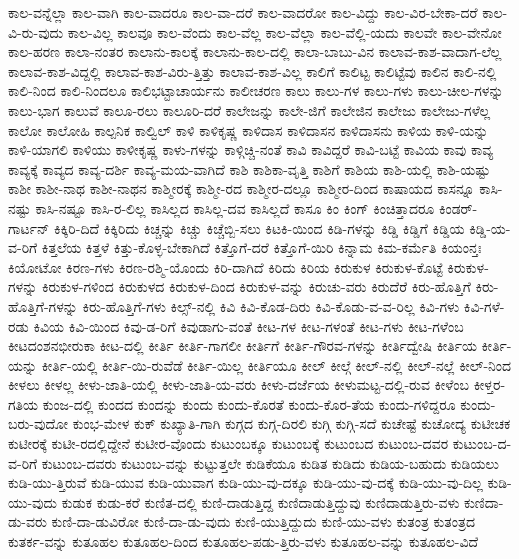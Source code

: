 {ಕಾಲ-ವನ್ನೆಲ್ಲಾ
ಕಾಲ-ವಾಗಿ
ಕಾಲ-ವಾದರೂ
ಕಾಲ-ವಾ-ದರೆ
ಕಾಲ-ವಾದರೋ
ಕಾಲ-ವಿದ್ದು
ಕಾಲ-ವಿರ-ಬೇಕಾ-ದರೆ
ಕಾಲ-ವಿ-ರು-ವುದು
ಕಾಲ-ವಿಲ್ಲ
ಕಾಲವೂ
ಕಾಲ-ವೆಂದು
ಕಾಲ-ವೆಲ್ಲ
ಕಾಲ-ವೆಲ್ಲಾ
ಕಾಲ-ವೆಲ್ಲಿ-ಯದು
ಕಾಲವೇ
ಕಾಲ-ವೇನೋ
ಕಾಲ-ಹರಣ
ಕಾಲಾ-ನಂತರ
ಕಾಲಾನು-ಕಾಲಕ್ಕೆ
ಕಾಲಾನು-ಕಾಲ-ದಲ್ಲಿ
ಕಾಲಾ-ಬಾಬು-ವಿನ
ಕಾಲಾವ-ಕಾಶ-ವಾದಾಗ-ಲೆಲ್ಲ
ಕಾಲಾವ-ಕಾಶ-ವಿದ್ದಲ್ಲಿ
ಕಾಲಾವ-ಕಾಶ-ವಿರು-ತ್ತಿತ್ತು
ಕಾಲಾವ-ಕಾಶ-ವಿಲ್ಲ
ಕಾಲಿಗೆ
ಕಾಲಿಟ್ಟ
ಕಾಲಿಟ್ಟೆವು
ಕಾಲಿನ
ಕಾಲಿ-ನಲ್ಲಿ
ಕಾಲಿ-ನಿಂದ
ಕಾಲಿ-ನಿಂದಲೂ
ಕಾಲಿಭಟ್ಟಾಚಾರ್ಯನು
ಕಾಲೀಚರಣ
ಕಾಲು
ಕಾಲು-ಗಳ
ಕಾಲು-ಗಳು
ಕಾಲು-ಚೀಲ-ಗಳನ್ನು
ಕಾಲು-ಭಾಗ
ಕಾಲುವೆ
ಕಾಲೂ-ರಲು
ಕಾಲೂರಿ-ದರೆ
ಕಾಲೇಜನ್ನು
ಕಾಲೇ-ಜಿಗೆ
ಕಾಲೇಜಿನ
ಕಾಲೇಜು
ಕಾಲೇಜು-ಗಳೆಲ್ಲ
ಕಾಲೋ
ಕಾಲೋಹಿ
ಕಾಲ್ಪನಿಕ
ಕಾಲ್ವಿಲ್
ಕಾಳಿ
ಕಾಳಿಕೃಷ್ಣ
ಕಾಳಿದಾಸ
ಕಾಳಿದಾಸನ
ಕಾಳಿದಾಸನು
ಕಾಳಿಯ
ಕಾಳಿ-ಯನ್ನು
ಕಾಳಿ-ಯಾಗಲಿ
ಕಾಳಿಯು
ಕಾಳೀಕೃಷ್ಣ
ಕಾಳು-ಗಳನ್ನು
ಕಾಳ್ಗಿಚ್ಚಿ-ನಂತೆ
ಕಾವಿ
ಕಾವಿದ್ದರೆ
ಕಾವಿ-ಬಟ್ಟೆ
ಕಾವಿಯ
ಕಾವು
ಕಾವ್ಯ
ಕಾವ್ಯಕ್ಕೆ
ಕಾವ್ಯದ
ಕಾವ್ಯ-ದರ್ಶಿ
ಕಾವ್ಯ-ಮಯ-ವಾಗಿದೆ
ಕಾಶಿ
ಕಾಶಿಕಾ-ವೃತ್ತಿ
ಕಾಶಿಗೆ
ಕಾಶಿಯ
ಕಾಶಿ-ಯಲ್ಲಿ
ಕಾಶಿ-ಯಷ್ಟು
ಕಾಶೀ
ಕಾಶೀ-ನಾಥ
ಕಾಶೀ-ನಾಥನ
ಕಾಶ್ಮೀರಕ್ಕೆ
ಕಾಶ್ಮೀ-ರದ
ಕಾಶ್ಮೀರ-ದಲ್ಲೂ
ಕಾಶ್ಮೀರ-ದಿಂದ
ಕಾಷಾಯದ
ಕಾಸನ್ನೂ
ಕಾಸಿ-ನಷ್ಟು
ಕಾಸಿ-ನಷ್ಟೂ
ಕಾಸಿ-ರ-ಲಿಲ್ಲ
ಕಾಸಿಲ್ಲದ
ಕಾಸಿಲ್ಲ-ದವ
ಕಾಸಿಲ್ಲದೆ
ಕಾಸೂ
ಕಿಂ
ಕಿಂಗ್
ಕಿಂಚಿತ್ತಾದರೂ
ಕಿಂಡರ್-ಗಾರ್ಟನ್
ಕಿಕ್ಕಿರಿ-ದಿದೆ
ಕಿಕ್ಕಿರಿದು
ಕಿಚ್ಚನ್ನು
ಕಿಚ್ಚು
ಕಿಚ್ಚೆಬ್ಬಿ-ಸಲು
ಕಿಟಕಿ-ಯಿಂದ
ಕಿಡಿ-ಗಳನ್ನು
ಕಿಡ್ಡಿ
ಕಿಡ್ಡಿಗೆ
ಕಿಡ್ಡಿಯ
ಕಿಡ್ಡಿ-ಯ-ವ-ರಿಗೆ
ಕಿತ್ತಲೆಯ
ಕಿತ್ತಳೆ
ಕಿತ್ತು-ಕೊಳ್ಳ-ಬೇಕಾಗಿದೆ
ಕಿತ್ತೊಗೆ-ದರೆ
ಕಿತ್ತೊಗೆ-ಯಿರಿ
ಕಿನ್ನಾಮ
ಕಿಮ-ಕರ್ಮೆತಿ
ಕಿಯಂನ್ತಃ
ಕಿಯೋಟೋ
ಕಿರಣ-ಗಳು
ಕಿರಣ-ರಶ್ಮಿ-ಯೊಂದು
ಕಿರಿ-ದಾಗಿದೆ
ಕಿರಿದು
ಕಿರಿಯ
ಕಿರುಕುಳ
ಕಿರುಕುಳ-ಕೊಟ್ಟೆ
ಕಿರುಕುಳ-ಗಳನ್ನು
ಕಿರುಕುಳ-ಗಳಿಂದ
ಕಿರುಕುಳದ
ಕಿರುಕುಳ-ದಿಂದ
ಕಿರುಕುಳ-ವನ್ನು
ಕಿರುಚು-ವರು
ಕಿರುದೆರೆ
ಕಿರು-ಹೊತ್ತಿಗೆ
ಕಿರು-ಹೊತ್ತಿಗೆ-ಗಳನ್ನು
ಕಿರು-ಹೊತ್ತಿಗೆ-ಗಳು
ಕಿಲ್ಸ್-ನಲ್ಲಿ
ಕಿವಿ
ಕಿವಿ-ಕೊಡ-ದಿರು
ಕಿವಿ-ಕೊಡು-ವ-ವ-ರಿಲ್ಲ
ಕಿವಿ-ಗಳು
ಕಿವಿ-ಗಳೆ-ರಡು
ಕಿವಿಯ
ಕಿವಿ-ಯಿಂದ
ಕಿವು-ಡ-ರಿಗೆ
ಕಿವುಡಾಗು-ವಂತೆ
ಕೀಟ-ಗಳ
ಕೀಟ-ಗಳಂತೆ
ಕೀಟ-ಗಳು
ಕೀಟ-ಗಳೆಂಬ
ಕೀಟದಂಶನಭೀರುಕಾ
ಕೀಟ-ದಲ್ಲಿ
ಕೀರ್ತಿ
ಕೀರ್ತಿ-ಗಾಗಲೀ
ಕೀರ್ತಿಗೆ
ಕೀರ್ತಿ-ಗೌರವ-ಗಳನ್ನು
ಕೀರ್ತಿದ್ವೇಷಿ
ಕೀರ್ತಿಯ
ಕೀರ್ತಿ-ಯನ್ನು
ಕೀರ್ತಿ-ಯಲ್ಲಿ
ಕೀರ್ತಿ-ಯಿ-ರುವೆಡೆ
ಕೀರ್ತಿ-ಯಿಲ್ಲ
ಕೀರ್ತಿಯೂ
ಕೀಲ್
ಕೀಲ್ಗೆ
ಕೀಲ್-ನಲ್ಲಿ
ಕೀಲ್-ನಲ್ಲೆ
ಕೀಲ್-ನಿಂದ
ಕೀಳಲು
ಕೀಳಲ್ಲ
ಕೀಳು-ಜಾತಿ-ಯಲ್ಲಿ
ಕೀಳು-ಜಾತಿ-ಯ-ವರು
ಕೀಳು-ದರ್ಜೆಯ
ಕೀಳುಮಟ್ಟ-ದಲ್ಲಿ-ರುವ
ಕೀಳೆಂಬ
ಕೀಳ್ತರ-ಗತಿಯ
ಕುಂಜ-ದಲ್ಲಿ
ಕುಂದದ
ಕುಂದನ್ನು
ಕುಂದು
ಕುಂದು-ಕೊರತೆ
ಕುಂದು-ಕೊರ-ತೆಯ
ಕುಂದು-ಗಳಿದ್ದರೂ
ಕುಂದು-ಬರು-ವುದೋ
ಕುಂಭ-ಮೇಳ
ಕುಕ್
ಕುಖ್ಯಾತಿ-ಗಾಗಿ
ಕುಗ್ಗದ
ಕುಗ್ಗ-ದಿರಲಿ
ಕುಗ್ಗಿ
ಕುಗ್ಗಿ-ಸದೆ
ಕುಚೇಷ್ಟೆ
ಕುಚೋದ್ಯ
ಕುಟೀಚಕ
ಕುಟೀರಕ್ಕೆ
ಕುಟೀ-ರದಲ್ಲಿದ್ದೇನೆ
ಕುಟೀರ-ವೊಂದು
ಕುಟುಂಬಕ್ಕೂ
ಕುಟುಂಬಕ್ಕೆ
ಕುಟುಂಬದ
ಕುಟುಂಬ-ದವರ
ಕುಟುಂಬ-ದ-ವ-ರಿಗೆ
ಕುಟುಂಬ-ದವರು
ಕುಟುಂಬ-ವನ್ನು
ಕುಟ್ಟುತ್ತಲೇ
ಕುಡಿಕೆಯೂ
ಕುಡಿತ
ಕುಡಿದು
ಕುಡಿಯ-ಬಹುದು
ಕುಡಿಯಲು
ಕುಡಿ-ಯು-ತ್ತಿರುವೆ
ಕುಡಿ-ಯುವ
ಕುಡಿ-ಯುವಾಗ
ಕುಡಿ-ಯು-ವು-ದಕ್ಕೂ
ಕುಡಿ-ಯು-ವು-ದಕ್ಕೆ
ಕುಡಿ-ಯು-ವು-ದಿಲ್ಲ
ಕುಡಿ-ಯು-ವುದು
ಕುಡುಕ
ಕುಡು-ಕರೆ
ಕುಣಿತ-ದಲ್ಲಿ
ಕುಣಿ-ದಾಡುತ್ತಿದ್ದ
ಕುಣಿದಾಡುತ್ತಿದ್ದುವು
ಕುಣಿದಾಡುತ್ತಿರು-ವಳು
ಕುಣಿದಾ-ಡು-ವರು
ಕುಣಿ-ದಾ-ಡುವಿರೋ
ಕುಣಿ-ದಾ-ಡು-ವುದು
ಕುಣಿ-ಯುತ್ತಿದ್ದುದು
ಕುಣಿ-ಯು-ವಳು
ಕುತಂತ್ರ
ಕುತಂತ್ರದ
ಕುತರ್ಕ-ವನ್ನು
ಕುತೂಹಲ
ಕುತೂಹಲ-ದಿಂದ
ಕುತೂಹಲ-ಪಡು-ತ್ತಿರು-ವಳು
ಕುತೂಹಲ-ವನ್ನು
ಕುತೂಹಲ-ವಿದೆ
}
